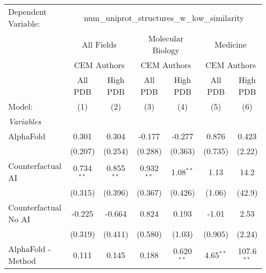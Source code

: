 \begingroup
\centering
\begin{tabular}{lcccccc}
   \tabularnewline \midrule \midrule
   Dependent Variable: & \multicolumn{6}{c}{num\_uniprot\_structures\_w\_low\_similarity}\\
 & \multicolumn{2}{c}{All Fields} & \multicolumn{2}{c}{Molecular Biology} & \multicolumn{2}{c}{Medicine} \\
\cmidrule(lr){2-3} \cmidrule(lr){4-5} \cmidrule(lr){6-7}
 & \multicolumn{2}{c}{CEM Authors} & \multicolumn{2}{c}{CEM Authors} & \multicolumn{2}{c}{CEM Authors} \\
\cmidrule(lr){2-3} \cmidrule(lr){4-5} \cmidrule(lr){6-7}
 & \multicolumn{1}{c}{All PDB} & \multicolumn{1}{c}{High PDB} & \multicolumn{1}{c}{All PDB} & \multicolumn{1}{c}{High PDB} & \multicolumn{1}{c}{All PDB} & \multicolumn{1}{c}{High PDB} \\
\cmidrule(lr){2-2} \cmidrule(lr){3-3} \cmidrule(lr){4-4} \cmidrule(lr){5-5} \cmidrule(lr){6-6} \cmidrule(lr){7-7}
   Model:                                                     & (1)           & (2)           & (3)          & (4)           & (5)           & (6)\\  
   \midrule
   \emph{Variables}\\
   AlphaFold                                                  & 0.301         & 0.304         & -0.177       & -0.277        & 0.876         & 0.423\\   
                                                              & (0.207)       & (0.254)       & (0.288)      & (0.363)       & (0.735)       & (2.22)\\   
   Counterfactual AI                                          & 0.734$^{**}$  & 0.855$^{**}$  & 0.932$^{**}$ & 1.08$^{**}$   & 1.13          & 14.2\\   
                                                              & (0.315)       & (0.396)       & (0.367)      & (0.426)       & (1.06)        & (42.9)\\   
   Counterfactual No AI                                       & -0.225        & -0.664        & 0.824        & 0.193         & -1.01         & 2.53\\   
                                                              & (0.319)       & (0.411)       & (0.580)      & (1.03)        & (0.905)       & (2.24)\\   
   AlphaFold - Method                                         & 0.111         & 0.145         & 0.188        & 0.620$^{**}$  & 4.65$^{**}$   & 107.6$^{**}$\\   

\end{tabular}
